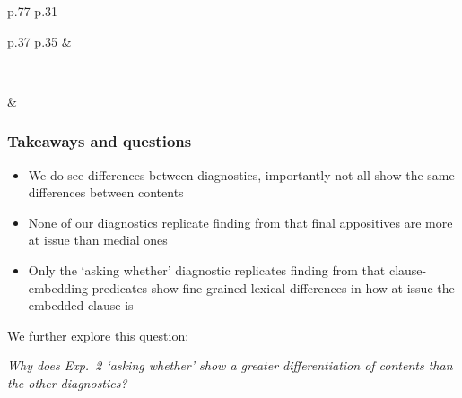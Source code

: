 \documentclass[compress, xcolor = dvipsnames, aspectratio=169, handout]{beamer}
\begin{document}
\begin{frame}[t]
\begin{minipage}{\textwidth}
\begin{minipage}{\textwidth}
\begin{tabular}{p{.77\textwidth} p{.31\textwidth}}
\begin{tabular}{p{.37\textwidth} p{.35\textwidth}}
		      		&
						\parbox{\linewidth}{
						\vspace{.2cm}
						\vspace{.1cm}}
		      		\\
				\end{tabular}

				&
				\\ 
			\end{tabular}
		\end{minipage}
		\end{minipage}
	
	\end{frame}

	\begin{frame}\frametitle{Takeaways and questions}
		\begin{itemize}
			\item We do see differences between diagnostics, importantly not all show the same differences between contents\pause

			\item None of our diagnostics replicate finding from \citet{syrett_experimental_2015} that final appositives are more at issue than medial ones\pause

			\item Only the `asking whether' diagnostic replicates finding from \citealt{degen-tonhauser-glossa} that clause-embedding predicates show fine-grained lexical differences in how at-issue the embedded clause is\pause

		\end{itemize}	\bigskip 

		We further explore this question:

		\begin{center}
			\emph{Why does Exp.~2 `asking whether' show a greater differentiation of contents than the other diagnostics?}
		\end{center}
		
	\end{frame}
\end{document}
